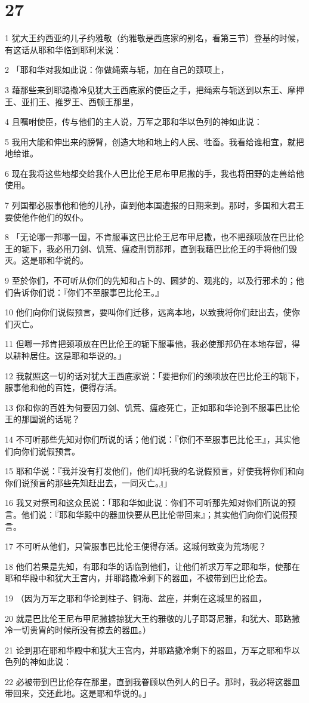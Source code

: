 \chapter{27}

\par 1 犹大王约西亚的儿子约雅敬（约雅敬是西底家的别名，看第三节）登基的时候，有这话从耶和华临到耶利米说：
\par 2 「耶和华对我如此说：你做绳索与轭，加在自己的颈项上，
\par 3 藉那些来到耶路撒冷见犹大王西底家的使臣之手，把绳索与轭送到以东王、摩押王、亚扪王、推罗王、西顿王那里，
\par 4 且嘱咐使臣，传与他们的主人说，万军之耶和华以色列的神如此说：
\par 5 我用大能和伸出来的膀臂，创造大地和地上的人民、牲畜。我看给谁相宜，就把地给谁。
\par 6 现在我将这些地都交给我仆人巴比伦王尼布甲尼撒的手，我也将田野的走兽给他使用。
\par 7 列国都必服事他和他的儿孙，直到他本国遭报的日期来到。那时，多国和大君王要使他作他们的奴仆。
\par 8 「无论哪一邦哪一国，不肯服事这巴比伦王尼布甲尼撒，也不把颈项放在巴比伦王的轭下，我必用刀剑、饥荒、瘟疫刑罚那邦，直到我藉巴比伦王的手将他们毁灭。这是耶和华说的。
\par 9 至於你们，不可听从你们的先知和占卜的、圆梦的、观兆的，以及行邪术的；他们告诉你们说：『你们不至服事巴比伦王。』
\par 10 他们向你们说假预言，要叫你们迁移，远离本地，以致我将你们赶出去，使你们灭亡。
\par 11 但哪一邦肯把颈项放在巴比伦王的轭下服事他，我必使那邦仍在本地存留，得以耕种居住。这是耶和华说的。」
\par 12 我就照这一切的话对犹大王西底家说：「要把你们的颈项放在巴比伦王的轭下，服事他和他的百姓，便得存活。
\par 13 你和你的百姓为何要因刀剑、饥荒、瘟疫死亡，正如耶和华论到不服事巴比伦王的那国说的话呢？
\par 14 不可听那些先知对你们所说的话；他们说：『你们不至服事巴比伦王』，其实他们向你们说假预言。
\par 15 耶和华说：『我并没有打发他们，他们却托我的名说假预言，好使我将你们和向你们说预言的那些先知赶出去，一同灭亡。』」
\par 16 我又对祭司和这众民说：「耶和华如此说：你们不可听那先知对你们所说的预言。他们说：『耶和华殿中的器皿快要从巴比伦带回来』；其实他们向你们说假预言。
\par 17 不可听从他们，只管服事巴比伦王便得存活。这城何致变为荒场呢？
\par 18 他们若果是先知，有耶和华的话临到他们，让他们祈求万军之耶和华，使那在耶和华殿中和犹大王宫内，并耶路撒冷剩下的器皿，不被带到巴比伦去。
\par 19 （因为万军之耶和华论到柱子、铜海、盆座，并剩在这城里的器皿，
\par 20 就是巴比伦王尼布甲尼撒掳掠犹大王约雅敬的儿子耶哥尼雅，和犹大、耶路撒冷一切贵胄的时候所没有掠去的器皿。）
\par 21 论到那在耶和华殿中和犹大王宫内，并耶路撒冷剩下的器皿，万军之耶和华以色列的神如此说：
\par 22 必被带到巴比伦存在那里，直到我眷顾以色列人的日子。那时，我必将这器皿带回来，交还此地。这是耶和华说的。」

